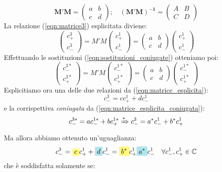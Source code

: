 \documentclass[../../FisicaTeorica.tex]{subfiles}
\begin{document}
\[
\bm{M'M}=\begin{pmatrix}
a & b\\
c & d
\end{pmatrix};\quad
\bm{(M'M)^{-1}}=\begin{pmatrix}
A & B\\
C & D
\end{pmatrix}
\]
La relazione (\ref{eqn:matrice3}) esplicitata diviene:
\begin{equation}
\begin{pmatrix}
c^3_+\\
c^3_-
\end{pmatrix}
=M'M \begin{pmatrix}
c^1_+\\
c^1_-
\end{pmatrix}
= \begin{pmatrix}
a&b\\
c & d
\end{pmatrix}
\begin{pmatrix}
c^1_+\\
c^1_-
\end{pmatrix}
\label{eqn:matrice_esplicita}
\end{equation}
Effettuando le sostituzioni (\ref{eqn:sostituzioni_coniugate}) otteniamo poi:
\begin{equation}
\begin{pmatrix}
c^{3*}_-\\
c^{3*}_+
\end{pmatrix}=
M'M\begin{pmatrix}
c^{1*}_-\\
c^{1*}_+
\end{pmatrix} =
\begin{pmatrix}
a & b\\
c & d
\end{pmatrix}
\begin{pmatrix}
c^{1*}_-\\
c^{1*}_+
\end{pmatrix}
\label{eqn:matrice_esplicita_coniugata}
\end{equation}
Esplicitiamo ora una delle due relazioni da (\ref{eqn:matrice_esplicita}):
\[
c^3_- = c c^1_+ + dc^1_-
\]
e la corrispettiva \textit{coniugata} da (\ref{eqn:matrice_esplicita_coniugata}):
\[
c^{3*}_- = ac^{1*}_- + bc^{1*}_+ \xRightarrow[]{*}
c^3_- = a^* c^1_- + b^* c^1_+
\]
Ma allora abbiamo ottenuto un'uguaglianza:
\[
c^3_-=\hlc{Yellow}{c}c^1_++\hlc{SkyBlue}{d}c^1_-=\hlc{Yellow}{b^*}c^1_+ \hlc{SkyBlue}{a^*}c^1_- \quad \forall c^1_-, c^1_+ \in \bb{C}
\]
che è soddisfatta solamente se:
\end{document}
